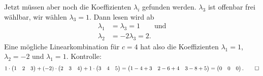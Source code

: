 \begin{loesung}
Jetzt müssen aber noch die Koeffizienten $\lambda_i$ gefunden werden.
$\lambda_3$ ist offenbar frei wählbar, wir wählen $\lambda_3=1$.
Dann lesen wird ab
\begin{align*}
\lambda_1 &= \lambda_3=1\qquad\text{und}\\
\lambda_2 &= -2\lambda_3=2.
\end{align*}
Eine mögliche Linearkombination für $c=4$ hat also die Koeffizienten
$\lambda_1=1$,
$\lambda_2=-2$
und
$\lambda_1=1$.
Kontrolle:
\[
1\cdot\begin{pmatrix}1&2&3\end{pmatrix}
+
(-2)\cdot \begin{pmatrix}2&3&4\end{pmatrix}
+
1\cdot\begin{pmatrix}3&4&5\end{pmatrix}
=
\begin{pmatrix}
1-4+3& 2-6+4&3-8+5
\end{pmatrix}
=
\begin{pmatrix}0&0&0\end{pmatrix}.
\qedhere
\]
\end{loesung}

